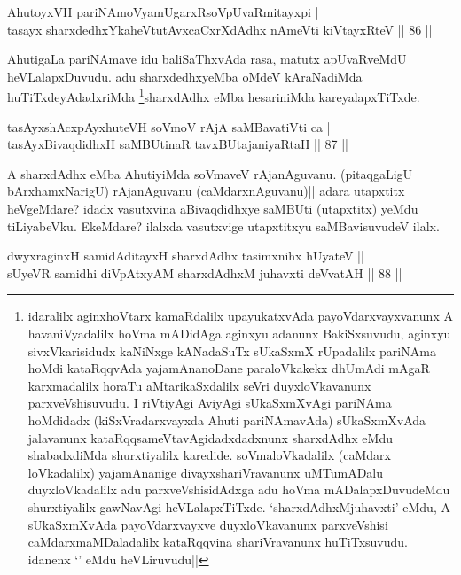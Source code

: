 \begin{shl}
AhutoyxVH pariNAmoV\s yamUgarxRsoV\s pUvaRmitayxpi | \\
tasayx sharxdedhxYkaheVtutAvxcaCxrXdAdhx nAmeVti kiVtayxRteV \hfill|| 86 || 
\end{shl}

\begin{artha}
AhutigaLa pariNAmave idu baliSaThxvAda rasa, matutx apUvaRveMdU 
heVLalapxDuvudu. adu sharxdedhxyeMba oMdeV kAraNadiMda 
huTiTxdeyAdadxriMda \footnote[2]{idaralilx aginxhoVtarx kamaRdalilx 
upayukatxvAda payoVdarxvayxvanunx A havaniVyadalilx hoVma mADidAga 
aginxyu adanunx BakiSxsuvudu, aginxyu sivxVkarisidudx kaNiNxge 
kANadaSuTx sUkaSxmX rUpadalilx pariNAma hoMdi kataRqqvAda 
yajamAnanoDane paraloVkakekx dhUmAdi mAgaR karxmadalilx horaTu 
aMtarikaSxdalilx seVri duyxloVkavanunx parxveVshisuvudu. I riVtiyAgi 
AviyAgi sUkaSxmXvAgi pariNAma hoMdidadx (kiSxVradarxvayxda Ahuti 
pariNAmavAda) sUkaSxmXvAda jalavanunx kataRqqsameVtavAgidadxdadxnunx 
sharxdAdhx eMdu shabadxdiMda shurxtiyalilx karedide. soVmaloVkadalilx 
(caMdarx loVkadalilx) yajamAnanige divayxshariVravanunx uMTumADalu 
duyxloVkadalilx adu parxveVshisidAdxga adu hoVma mADalapxDuvudeMdu 
shurxtiyalilx gawNavAgi heVLalapxTiTxde. `sharxdAdhxMjuhavxti' eMdu, A 
sUkaSxmXvAda payoVdarxvayxve duyxloVkavanunx parxveVshisi 
caMdarxmaMDaladalilx kataRqqvina shariVravanunx huTiTxsuvudu. idanenx 
`\stext' eMdu heVLiruvudu||}sharxdAdhx eMba hesariniMda 
kareyalapxTiTxde.
\end{artha}


\begin{shl}
tasAyxshAcxpAyxhuteVH soVmoV rAjA saMBavatiVti ca | \\
tasAyxBivaqdidhxH saMBUtinaR tavxBUtajaniyaRtaH \hfill|| 87 || 
\end{shl}

\begin{artha}
A sharxdAdhx eMba AhutiyiMda soVmaveV rAjanAguvanu. (pitaqgaLigU 
bArxhamxNarigU) rAjanAguvanu (caMdarxnAguvanu)|| adara utapxtitx 
heVgeMdare? idadx vasutxvina aBivaqdidhxye saMBUti (utapxtitx) yeMdu 
tiLiyabeVku. EkeMdare? ilalxda vasutxvige utapxtitxyu saMBavisuvudeV 
ilalx.
\end{artha}


\begin{shl}
dwyxraginxH samidAditayxH sharxdAdhx tasimxnihx hUyateV || \\
sUyeVR samidhi diVpAtxyAM sharxdAdhxM juhavxti deVvatAH \hfill|| 88 || 
\end{shl}

